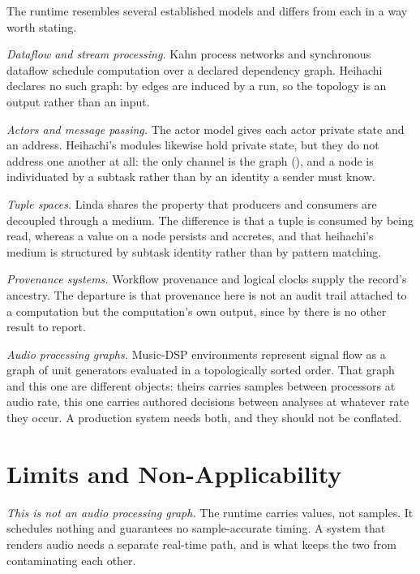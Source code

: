 \documentclass[11pt,twocolumn,a4paper]{article}
\theoremstyle{definition}
\theoremstyle{remark}
\begin{document}
The runtime resembles several established models and differs from each in a way
worth stating.

\emph{Dataflow and stream processing.} Kahn process networks
\citep{kahn1974semantics} and synchronous dataflow \citep{lee1987synchronous}
schedule computation over a declared dependency graph. Heihachi declares no such
graph: by  edges are induced by a run, so the topology is an
output rather than an input.

\emph{Actors and message passing.} The actor model \citep{hewitt1973universal}
gives each actor private state and an address. Heihachi's modules likewise hold
private state, but they do not address one another at all: the only channel is
the graph (), and a node is individuated by a subtask rather
than by an identity a sender must know.

\emph{Tuple spaces.} Linda \citep{gelernter1985generative} shares the property
that producers and consumers are decoupled through a medium. The difference is
that a tuple is consumed by being read, whereas a value on a node persists and
accretes, and that heihachi's medium is structured by subtask identity rather
than by pattern matching.

\emph{Provenance systems.} Workflow provenance \citep{davidson2008provenance} and
logical clocks \citep{lamport1978time} supply the record's ancestry. The
departure is that provenance here is not an audit trail attached to a
computation but the computation's own output, since by  there
is no other result to report.

\emph{Audio processing graphs.} Music-DSP environments
\citep{puckette1996pure,mccartney2002rethinking} represent signal flow as a graph
of unit generators evaluated in a topologically sorted order. That graph and this
one are different objects: theirs carries samples between processors at audio
rate, this one carries authored decisions between analyses at whatever rate they
occur. A production system needs both, and they should not be conflated.

\section{Limits and Non-Applicability}
\label{sec:limits}

\emph{This is not an audio processing graph.} The runtime carries values, not
samples. It schedules nothing and guarantees no sample-accurate timing. A system
that renders audio needs a separate real-time path, and 
is what keeps the two from contaminating each other.
\end{document}

